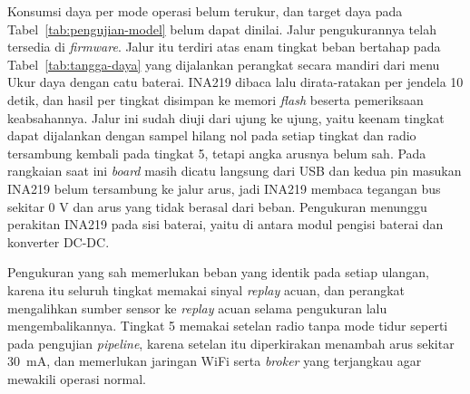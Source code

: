 Konsumsi daya per mode operasi belum terukur, dan target daya pada Tabel~\ref{tab:pengujian-model} belum dapat dinilai. Jalur pengukurannya telah tersedia di \textit{firmware}. Jalur itu terdiri atas enam tingkat beban bertahap pada Tabel~\ref{tab:tangga-daya} yang dijalankan perangkat secara mandiri dari menu Ukur daya dengan catu baterai. INA219 dibaca lalu dirata-ratakan per jendela 10 detik, dan hasil per tingkat disimpan ke memori \textit{flash} beserta pemeriksaan keabsahannya. Jalur ini sudah diuji dari ujung ke ujung, yaitu keenam tingkat dapat dijalankan dengan sampel hilang nol pada setiap tingkat dan radio tersambung kembali pada tingkat 5, tetapi angka arusnya belum sah. Pada rangkaian saat ini \textit{board} masih dicatu langsung dari USB dan kedua pin masukan INA219 belum tersambung ke jalur arus, jadi INA219 membaca tegangan bus sekitar 0 V dan arus yang tidak berasal dari beban. Pengukuran menunggu perakitan INA219 pada sisi baterai, yaitu di antara modul pengisi baterai dan konverter DC-DC. 

Pengukuran yang sah memerlukan beban yang identik pada setiap ulangan, karena itu seluruh tingkat memakai sinyal \textit{replay} acuan, dan perangkat mengalihkan sumber sensor ke \textit{replay} acuan selama pengukuran lalu mengembalikannya. Tingkat 5 memakai setelan radio tanpa mode tidur seperti pada pengujian \textit{pipeline}, karena setelan itu diperkirakan menambah arus sekitar 30~mA, dan memerlukan jaringan WiFi serta \textit{broker} yang terjangkau agar mewakili operasi normal.

